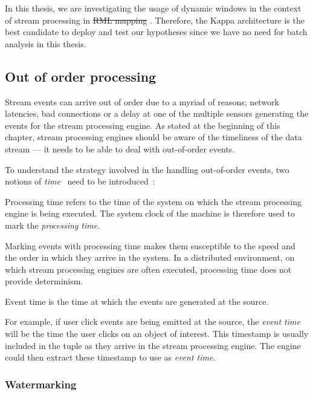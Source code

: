 In this thesis, we are investigating the usage of dynamic windows in the context of stream processing 
in \sout{RML mapping} . 
Therefore, the Kappa architecture is the best candidate to deploy and test our 
hypotheses since we have no need for batch analysis in this thesis.  

\subsection{Out of order processing}%
\label{sub:Out of order processing}
Stream events can arrive out of order due to a myriad of reasons; network latencies, 
bad connections or a delay at one of the multiple sensors generating the events for 
the stream processing engine. As stated at the beginning of this chapter, stream 
processing engines should be aware of the timeliness of the data stream --- it needs 
to be able to deal with out-of-order events. 

To understand the strategy involved in the handling out-of-order events, 
two notions of \emph{time}~ need to be introduced~\cite{watermark_flink}:  

\begin{defn}
    Processing time refers to the time of the system on which the stream processing 
    engine is being executed. The system clock of the machine is therefore used 
    to mark the \emph{processing time}. 
\end{defn}
Marking events with processing time makes them 
susceptible to the speed and the order in which they arrive in the system. 
In a distributed environment, on which stream processing engines are often 
executed, processing time does not provide determinism.


\begin{defn}
    Event time is the time at which the events are generated at the source.
\end{defn}
For example, if user click events are being emitted at the
source, the \emph{event time} will be the time the user clicks on an object of 
interest. This timestamp is usually included in the tuple as they arrive 
in the stream processing engine. The engine could then extract these 
timestamp to use as \emph{event time}. 


\subsubsection{Watermarking}%
\label{ssub:Watermarking}

